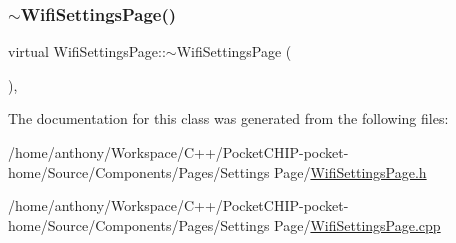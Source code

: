 \mbox{\label{classWifiSettingsPage_ab8e7a083fc6dbe1ec18b08e037078846}} 
\subsubsection{\texorpdfstring{$\sim$\+Wifi\+Settings\+Page()}{~WifiSettingsPage()}}
{\footnotesize\ttfamily virtual Wifi\+Settings\+Page\+::$\sim$\+Wifi\+Settings\+Page (\begin{DoxyParamCaption}{ }\end{DoxyParamCaption})\hspace{0.3cm}{\ttfamily [inline]}, {\ttfamily [virtual]}}



The documentation for this class was generated from the following files\+:\begin{DoxyCompactItemize}
\item 
/home/anthony/\+Workspace/\+C++/\+Pocket\+C\+H\+I\+P-\/pocket-\/home/\+Source/\+Components/\+Pages/\+Settings Page/\mbox{\hyperlink{WifiSettingsPage_8h}{Wifi\+Settings\+Page.\+h}}\item 
/home/anthony/\+Workspace/\+C++/\+Pocket\+C\+H\+I\+P-\/pocket-\/home/\+Source/\+Components/\+Pages/\+Settings Page/\mbox{\hyperlink{WifiSettingsPage_8cpp}{Wifi\+Settings\+Page.\+cpp}}\end{DoxyCompactItemize}
